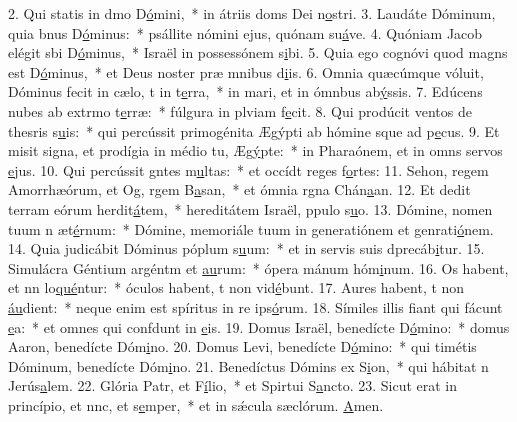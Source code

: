 2. Qui statis in dmo D\uline{ó}mini,~* in átriis doms Dei n\uline{o}stri.
3. Laudáte Dóminum, quia bnus D\uline{ó}minus:~* psállite nómini ejus, quónam su\uline{á}ve.
4. Quóniam Jacob elégit sbi D\uline{ó}minus,~* Israël in possessónem s\uline{i}bi.
5. Quia ego cognóvi quod magns est D\uline{ó}minus,~* et Deus noster præ mnibus d\uline{i}is.
6. Omnia quæcúmque vóluit, Dóminus fecit in cælo, t in t\uline{e}rra,~* in mari, et in ómnbus ab\uline{ý}ssis.
7. Edúcens nubes ab extrmo t\uline{e}rræ:~* fúlgura in plviam f\uline{e}cit.
8. Qui prodúcit ventos de thesris s\uline{u}is:~* qui percússit primogénita Ægýpti ab hómine sque ad p\uline{e}cus.
9. Et misit signa, et prodígia in médio tu, Æg\uline{ý}pte:~* in Pharaónem, et in omns servos \uline{e}jus.
10. Qui percússit gntes m\uline{u}ltas:~* et occídt reges f\uline{o}rtes:
11. Sehon, regem Amorrhæórum, et Og, rgem B\uline{a}san,~* et ómnia rgna Chán\uline{a}an.
12. Et dedit terram eórum herdit\uline{á}tem,~* hereditátem Israël, ppulo s\uline{u}o.
13. Dómine, nomen tuum n æt\uline{é}rnum:~* Dómine, memoriále tuum in generatiónem et genrati\uline{ó}nem.
14. Quia judicábit Dóminus póplum s\uline{u}um:~* et in servis suis dprecáb\uline{i}tur.
15. Simulácra Géntium argéntm et \uline{au}rum:~* ópera mánum hóm\uline{i}num.
16. Os habent, et nn lo\uline{qué}ntur:~* óculos habent, t non vid\uline{é}bunt.
17. Aures habent, t non \uline{áu}dient:~* neque enim est spíritus in re ips\uline{ó}rum.
18. Símiles illis fiant qui fácunt \uline{e}a:~* et omnes qui confdunt in \uline{e}is.
19. Domus Israël, benedícte D\uline{ó}mino:~* domus Aaron, benedícte Dóm\uline{i}no.
20. Domus Levi, benedícte D\uline{ó}mino:~* qui timétis Dóminum, benedícte Dóm\uline{i}no.
21. Benedíctus Dómins ex S\uline{i}on,~* qui hábitat n Jerús\uline{a}lem.
22. Glória Patr, et F\uline{í}lio,~* et Spirtui S\uline{a}ncto.
23. Sicut erat in princípio, et nnc, et s\uline{e}mper,~* et in sǽcula sæclórum. \uline{A}men.

